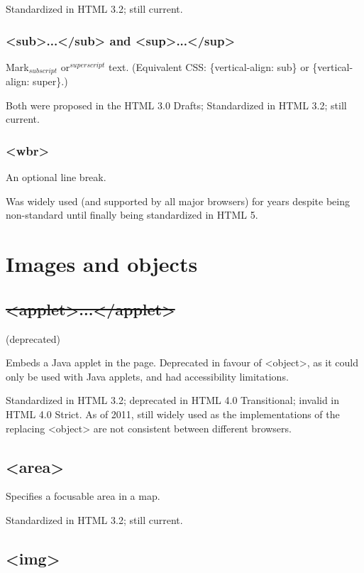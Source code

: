 Standardized in HTML 3.2; still current.


\subsubsection{<sub>...</sub> and <sup>...</sup>}

Mark${}_{subscript}$ or${}^{superscript}$ text. (Equivalent CSS: \{vertical-align: sub\} or \{vertical-align: super\}.)

Both were proposed in the HTML 3.0 Drafts; Standardized in HTML 3.2; still current.


\subsubsection{<wbr>}

An optional line break.

Was widely used (and supported by all major browsers) for years despite being non-standard until finally being standardized in HTML 5.


\section{Images and objects}


\subsection{\sout{<applet>...</applet>}}

(deprecated)

Embeds a Java applet in the page. Deprecated in favour of <object>, as it could only be used with Java applets, and had accessibility limitations.

Standardized in HTML 3.2; deprecated in HTML 4.0 Transitional; invalid in HTML 4.0 Strict. As of 2011, still widely used as the implementations of the replacing <object> are not consistent between different browsers.


\subsection{<area>}

Specifies a focusable area in a map.

Standardized in HTML 3.2; still current.

\subsection{<img>}

